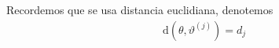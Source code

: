 \newpage

Recordemos que se usa distancia euclidiana, denotemos
\begin{align*}
    \text{d}(\theta, \vartheta^{(j)}) = d_j
\end{align*}











